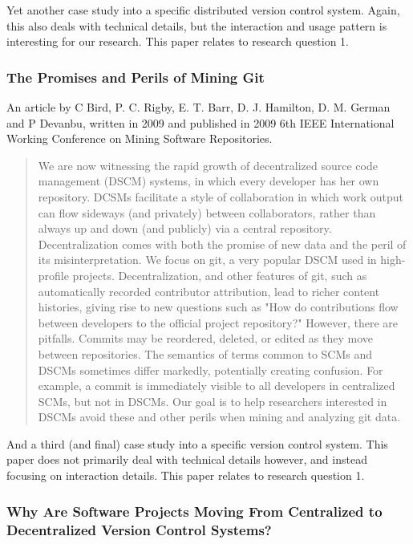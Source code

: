 \documentclass{article}
\begin{document}
Yet another case study into a specific distributed version control
system.  Again, this also deals with technical details, but the
interaction and usage pattern is interesting for our research. This
paper relates to research question 1.

\subsubsection{The Promises and Perils of Mining Git}

An article by C Bird, P. C. Rigby, E. T. Barr, D. J. Hamilton, D. M. German
and P Devanbu, written in 2009 and published in 2009 6th IEEE International 
Working Conference on Mining Software Repositories\cite{bird09}.

\begin{abstract}
 We are now witnessing the rapid growth of decentralized source code
 management (DSCM) systems, in which every developer has her own repository.
 DCSMs facilitate a style of collaboration in which work output can flow
 sideways (and privately) between collaborators, rather than always up and
 down (and publicly) via a central repository. Decentralization comes with
 both the promise of new data and the peril of its misinterpretation. We
 focus on git, a very popular DSCM used in high-profile projects.
 Decentralization, and other features of git, such as automatically recorded
 contributor attribution, lead to richer content histories, giving rise to
 new questions such as "How do contributions flow between developers to the
 official project repository?" However, there are pitfalls. Commits may be
 reordered, deleted, or edited as they move between repositories. The
 semantics of terms common to SCMs and DSCMs sometimes differ markedly,
 potentially creating confusion. For example, a commit is immediately
 visible to all developers in centralized SCMs, but not in DSCMs. Our goal
 is to help researchers interested in DSCMs avoid these and other perils
 when mining and analyzing git data.
\end{abstract}

And a third (and final) case study into a specific version control
system.  This paper does not primarily deal with technical details
however, and instead focusing on interaction details. This paper
relates to research question 1.

\subsubsection{Why Are Software Projects Moving From Centralized to
               Decentralized Version Control Systems?}
\end{document}
